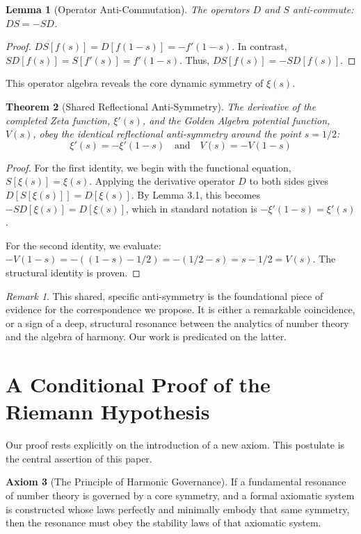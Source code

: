\documentclass{article}
\theoremstyle{plain}
\newtheorem{theorem}{Theorem}[section]
\newtheorem{lemma}[theorem]{Lemma}
\theoremstyle{definition}
\newtheorem{axiom}[theorem]{Axiom}
\theoremstyle{remark}
\newtheorem*{remark}{Remark}
\begin{document}
\begin{lemma}[Operator Anti-Commutation]
The operators $D$ and $S$ anti-commute: $DS = -SD$.
\end{lemma}
\begin{proof}
$DS[f(s)] = D[f(1-s)] = -f'(1-s)$. In contrast, $SD[f(s)] = S[f'(s)] = f'(1-s)$. Thus, $DS[f(s)] = -SD[f(s)]$.
\end{proof}

This operator algebra reveals the core dynamic symmetry of $\xi(s)$.

\begin{theorem}[Shared Reflectional Anti-Symmetry]
The derivative of the completed Zeta function, $\xi'(s)$, and the Golden Algebra potential function, $V(s)$, obey the identical reflectional anti-symmetry around the point $s=1/2$:
$$ \xi'(s) = -\xi'(1-s) \quad \text{and} \quad V(s) = -V(1-s) $$
\end{theorem}
\begin{proof}
For the first identity, we begin with the functional equation, $S[\xi(s)] = \xi(s)$. Applying the derivative operator $D$ to both sides gives $D[S[\xi(s)]] = D[\xi(s)]$. By Lemma 3.1, this becomes $-SD[\xi(s)] = D[\xi(s)]$, which in standard notation is $-\xi'(1-s) = \xi'(s)$.

For the second identity, we evaluate: $-V(1-s) = -((1-s) - 1/2) = -(1/2 - s) = s - 1/2 = V(s)$. The structural identity is proven.
\end{proof}

\begin{remark}
This shared, specific anti-symmetry is the foundational piece of evidence for the correspondence we propose. It is either a remarkable coincidence, or a sign of a deep, structural resonance between the analytics of number theory and the algebra of harmony. Our work is predicated on the latter.
\end{remark}

\section{A Conditional Proof of the Riemann Hypothesis}
\label{sec:proof}

Our proof rests explicitly on the introduction of a new axiom. This postulate is the central assertion of this paper.

\begin{axiom}[The Principle of Harmonic Governance]
If a fundamental resonance of number theory is governed by a core symmetry, and a formal axiomatic system is constructed whose laws perfectly and minimally embody that same symmetry, then the resonance must obey the stability laws of that axiomatic system.
\end{axiom}
\end{document}
